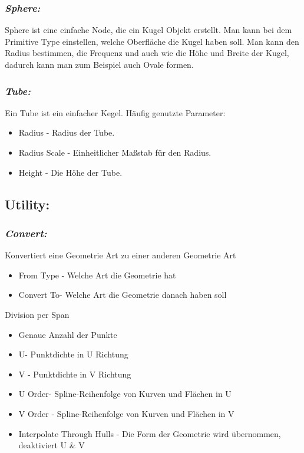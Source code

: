 \documentclass[paper=a4,fontsize=12pt,ngerman]{scrartcl}
\begin{document}
	\subsubsection*{\textit{Sphere:}}
	Sphere ist eine einfache Node, die ein Kugel Objekt erstellt. Man kann bei dem Primitive Type einstellen, welche Oberfläche die Kugel haben soll. Man kann den Radius bestimmen, die Frequenz und auch wie die Höhe und Breite der Kugel, dadurch kann man zum Beispiel auch Ovale formen. 
	\subsubsection*{\textit{Tube:}}
	Ein Tube ist ein einfacher Kegel. Häufig genutzte Parameter: 
	 	\begin{itemize}
	 		\item Radius - Radius der Tube. 
	 		\item Radius Scale - Einheitlicher Maßstab für den Radius. 
	 		\item Height - Die Höhe der Tube. 
	 	\end{itemize} 
	
	\subsection*{Utility:}
	\subsubsection*{\textit{Convert:}}
	Konvertiert eine Geometrie Art zu einer anderen Geometrie Art
	\begin{itemize}
		\item From Type - Welche Art die Geometrie hat
		\item Convert To- Welche Art die Geometrie danach haben soll
	\end{itemize}
	Division per Span
	\begin{itemize}
		\item Genaue Anzahl der Punkte
		\item U- Punktdichte in U Richtung
		\item V - Punktdichte in V Richtung
		\item U Order- Spline-Reihenfolge von Kurven und Flächen in U
		\item V Order - Spline-Reihenfolge von Kurven und Flächen in V
		\item Interpolate Through Hulls - Die Form der Geometrie wird übernommen, deaktiviert U \& V
	\end{itemize}
\end{document}
